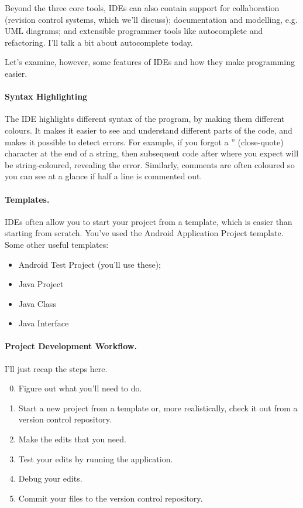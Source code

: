 Beyond the three core tools, IDEs can also contain support for
collaboration (revision control systems, which we'll discuss);
documentation and modelling, e.g. UML diagrams; and extensible
programmer tools like autocomplete and refactoring. I'll talk a bit
about autocomplete today.

Let's examine, however, some features of IDEs and how they make programming easier.

\paragraph{Syntax Highlighting} The IDE highlights different syntax of the program, by making them different colours. It makes it easier to see and understand different parts of the code, and makes it possible to detect errors. For example, if you forgot a '' (close-quote) character at the end of a string, then subsequent code after where you expect will be string-coloured, revealing the error. Similarly, comments are often coloured so you can see at a glance if half a line is commented out.


\paragraph{Templates.} IDEs often allow you to start your
project from a template, which is easier than starting from scratch.
You've used the Android Application Project template. Some other
useful templates:
\begin{itemize}
\item Android Test Project (you'll use these);
\item Java Project
\item Java Class
\item Java Interface
\end{itemize}

\paragraph{Project Development Workflow.}
I'll just recap the steps here.

\begin{enumerate}
\setcounter{enumi}{-1}\setlength{\itemsep}{-.5em}
\item Figure out what you'll need to do.
\item Start a new project from a template or, more realistically,
  check it out from a version control repository.
\item Make the edits that you need. 
\item Test your edits by running the application.
\item Debug your edits.
\item Commit your files to the version control repository.
\end{enumerate}

